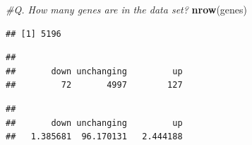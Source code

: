 \documentclass[
]{article}
\newenvironment{Shaded}{\begin{snugshade}}{\end{snugshade}}
\newcommand{\CommentTok}[1]{\textcolor[rgb]{0.56,0.35,0.01}{\textit{#1}}}
\newcommand{\DecValTok}[1]{\textcolor[rgb]{0.00,0.00,0.81}{#1}}
\newcommand{\FunctionTok}[1]{\textcolor[rgb]{0.13,0.29,0.53}{\textbf{#1}}}
\newcommand{\NormalTok}[1]{#1}
\newcommand{\SpecialCharTok}[1]{\textcolor[rgb]{0.81,0.36,0.00}{\textbf{#1}}}
\begin{document}
\begin{Shaded}
\begin{Highlighting}[]
\CommentTok{\#Q. How many genes are in the data set?}
\FunctionTok{nrow}\NormalTok{(genes)}
\end{Highlighting}
\end{Shaded}

\begin{verbatim}
## [1] 5196
\end{verbatim}

\begin{Shaded}
\end{Shaded}

\begin{verbatim}
## 
##       down unchanging         up 
##         72       4997        127
\end{verbatim}

\begin{Shaded}
\end{Shaded}

\begin{verbatim}
## 
##       down unchanging         up 
##   1.385681  96.170131   2.444188
\end{verbatim}
\end{document}
